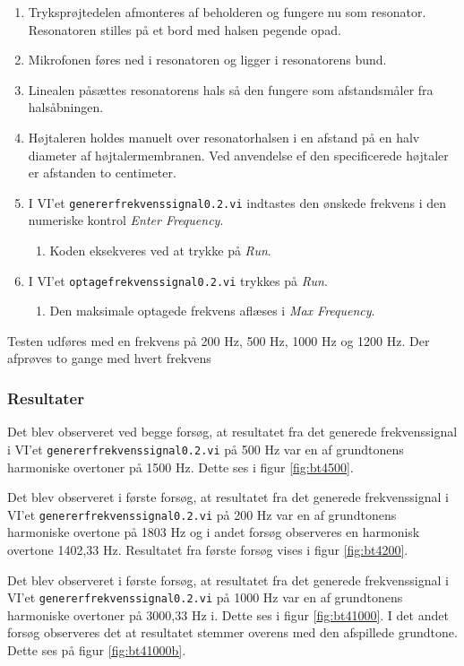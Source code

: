			\begin{enumerate}
				\item Tryksprøjtedelen afmonteres af beholderen og fungere nu som resonator. Resonatoren stilles på et bord med halsen pegende opad. 
				\item Mikrofonen føres ned i resonatoren og ligger i resonatorens bund. 
				\item Linealen påsættes resonatorens hals så den fungere som afstandsmåler fra halsåbningen.
				\item Højtaleren holdes manuelt over resonatorhalsen i en afstand på en halv diameter af højtalermembranen. Ved anvendelse ef den specificerede højtaler er afstanden to centimeter. 
				\item I VI'et \texttt{genererfrekvenssignal0.2.vi} indtastes den ønskede frekvens i den numeriske kontrol \textit{Enter Frequency}. 
					\begin{enumerate}
						\item Koden eksekveres ved at trykke på \textit{Run}. 
					\end{enumerate} 
				\item I VI'et \texttt{optagefrekvenssignal0.2.vi} trykkes på \textit{Run}. 
					\begin{enumerate}
						\item Den maksimale optagede frekvens aflæses i \textit{Max Frequency}. 
					\end{enumerate}	 	
			\end{enumerate}
			
			
			Testen udføres med en frekvens på 200 Hz, 500 Hz, 1000 Hz og 1200 Hz. Der afprøves to gange med hvert frekvens  
			
			\subsubsection{Resultater}
			Det blev observeret ved begge forsøg, at resultatet fra det generede frekvenssignal i VI'et \texttt{genererfrekvenssignal0.2.vi} på 500 Hz var  en af grundtonens harmoniske overtoner på 1500 Hz. Dette ses i figur \ref{fig:bt4500}. 

			 Det blev observeret i første forsøg, at resultatet fra det generede frekvenssignal i VI'et \texttt{genererfrekvenssignal0.2.vi} på 200 Hz var en af grundtonens harmoniske overtone på 1803 Hz og i andet forsøg observeres en harmonisk overtone 1402,33 Hz. Resultatet fra første forsøg vises i figur \ref{fig:bt4200}.
			 
			 Det blev observeret i første forsøg, at resultatet fra det generede frekvenssignal i VI'et \texttt{genererfrekvenssignal0.2.vi} på 1000 Hz var en af grundtonens harmoniske overtoner på 3000,33 Hz i. Dette ses i figur \ref{fig:bt41000}. I det andet forsøg observeres det at resultatet stemmer overens med den afspillede grundtone. Dette ses på figur \ref{fig:bt41000b}.  
			 
